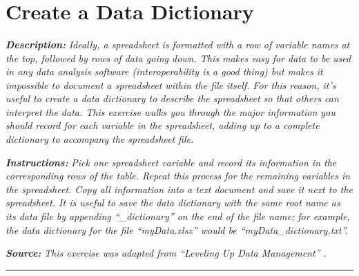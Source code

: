 \documentclass[
]{book}
\begin{document}
~

~

~

\hypertarget{data-dictionary}{%
\section{Create a Data Dictionary}\label{data-dictionary}}

\textbf{\emph{Description:}} \emph{Ideally, a spreadsheet is formatted with a row of variable names at the top, followed by rows of data going down. This makes easy for data to be used in any data analysis software (interoperability is a good thing) but makes it impossible to document a spreadsheet within the file itself. For this reason, it's useful to create a data dictionary to describe the spreadsheet so that others can interpret the data. This exercise walks you through the major information you should record for each variable in the spreadsheet, adding up to a complete dictionary to accompany the spreadsheet file.}

\textbf{\emph{Instructions:}} \emph{Pick one spreadsheet variable and record its information in the corresponding rows of the table. Repeat this process for the remaining variables in the spreadsheet. Copy all information into a text document and save it next to the spreadsheet. It is useful to save the data dictionary with the same root name as its data file by appending ``\_dictionary'' on the end of the file name; for example, the data dictionary for the file ``myData.xlsx'' would be ``myData\_dictionary.txt''.}

\textbf{\emph{Source:}} \emph{This exercise was adapted from ``Leveling Up Data Management'' \citep{briney_leveling_2023}.}

\begin{center}\rule{0.5\linewidth}{0.5pt}\end{center}
\end{document}
